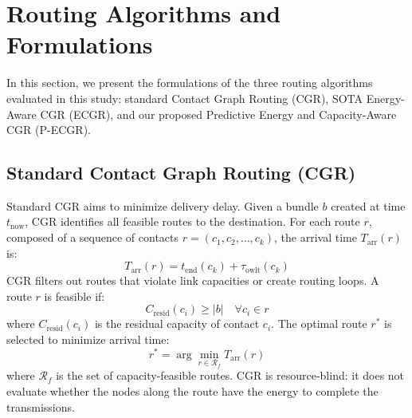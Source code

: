 \documentclass[journal,twocolumn]{IEEEtran}
\begin{document}
\section{Routing Algorithms and Formulations}
\label{sec:ecgr}

In this section, we present the formulations of the three routing algorithms evaluated in this study: standard Contact Graph Routing (CGR), SOTA Energy-Aware CGR (ECGR), and our proposed Predictive Energy and Capacity-Aware CGR (P-ECGR).

\subsection{Standard Contact Graph Routing (CGR)}
Standard CGR aims to minimize delivery delay. Given a bundle $b$ created at time $t_{\text{now}}$, CGR identifies all feasible routes to the destination. For each route $r$, composed of a sequence of contacts $r = (c_1, c_2, \dots, c_k)$, the arrival time $T_{\text{arr}}(r)$ is:
\begin{equation}
    T_{\text{arr}}(r) = t_{\text{end}}(c_k) + \tau_{\text{owlt}}(c_k)
\end{equation}
CGR filters out routes that violate link capacities or create routing loops. A route $r$ is feasible if:
\begin{equation}
    C_{\text{resid}}(c_i) \geq |b| \quad \forall c_i \in r
\end{equation}
where $C_{\text{resid}}(c_i)$ is the residual capacity of contact $c_i$. The optimal route $r^*$ is selected to minimize arrival time:
\begin{equation}
    r^* = \arg\min_{r \in \mathcal{R}_f} T_{\text{arr}}(r)
\end{equation}
where $\mathcal{R}_f$ is the set of capacity-feasible routes. CGR is resource-blind: it does not evaluate whether the nodes along the route have the energy to complete the transmissions.
\end{document}
